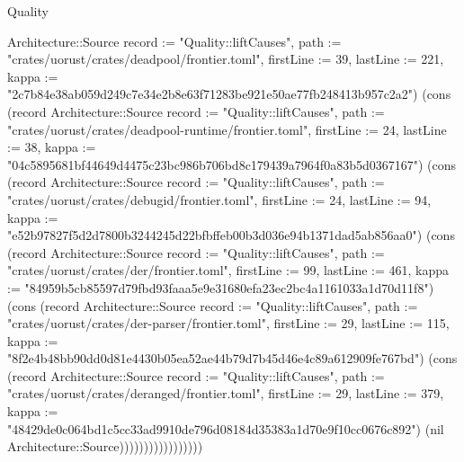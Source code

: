 \begin{lexlean}{Quality}
\begin{semanticmodule}
{Architecture::Source {record := "Quality::liftCauses", path := "crates/uorust/crates/deadpool/frontier.toml", firstLine := 39, lastLine := 221, kappa := "2c7b84e38ab059d249c7e34e2b8e63f71283be921e50ae77fb248413b957c2a2"}) (cons (record Architecture::Source {record := "Quality::liftCauses", path := "crates/uorust/crates/deadpool-runtime/frontier.toml", firstLine := 24, lastLine := 38, kappa := "04c5895681bf44649d4475c23bc986b706bd8c179439a7964f0a83b5d0367167"}) (cons (record Architecture::Source {record := "Quality::liftCauses", path := "crates/uorust/crates/debugid/frontier.toml", firstLine := 24, lastLine := 94, kappa := "e52b97827f5d2d7800b3244245d22bfbffeb00b3d036e94b1371dad5ab856aa0"}) (cons (record Architecture::Source {record := "Quality::liftCauses", path := "crates/uorust/crates/der/frontier.toml", firstLine := 99, lastLine := 461, kappa := "84959b5cb85597d79fbd93faaa5e9e31680efa23ec2bc4a1161033a1d70d11f8"}) (cons (record Architecture::Source {record := "Quality::liftCauses", path := "crates/uorust/crates/der-parser/frontier.toml", firstLine := 29, lastLine := 115, kappa := "8f2e4b48bb90dd0d81e4430b05ea52ae44b79d7b45d46e4c89a612909fe767bd"}) (cons (record Architecture::Source {record := "Quality::liftCauses", path := "crates/uorust/crates/deranged/frontier.toml", firstLine := 29, lastLine := 379, kappa := "48429de0c064bd1c5cc33ad9910de796d08184d35383a1d70e9f10cc0676c892"}) (nil Architecture::Source)))))))))))))))))
}


\end{semanticmodule}
\end{lexlean}
